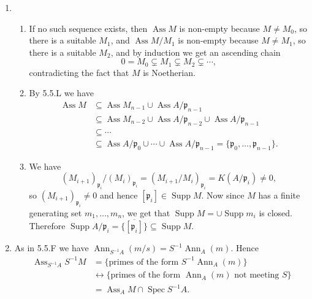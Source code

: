 \documentclass{report}
\newcommand{\closure}[1]{\overline{#1}} %
\newcommand{\p}{\mathfrak{p}}
\DeclareMathOperator{\Supp}{Supp}
\DeclareMathOperator{\Spec}{Spec}
\DeclareMathOperator{\Ann}{Ann}
\DeclareMathOperator{\Ass}{Ass}
\begin{document}
\begin{enumerate}[label=\textbf{5.5.\Alph*.}]
	\item
	      \begin{enumerate}[label=(\alph*)]
		      \item If no such sequence exists, then $\Ass M$ is non-empty
		            because $M\ne M_0$, so there is a suitable $M_1$, and
		            $\Ass M/M_1$ is non-empty because $M\ne M_1$, so there is a
		            suitable $M_2$, and by induction we get an ascending chain
		            \begin{equation*}
			            0 = M_0 \subsetneq M_1 \subsetneq M_2 \subsetneq \cdots,
		            \end{equation*}
		            contradicting the fact that $M$ is Noetherian.

		      \item By 5.5.L we have
		            \begin{align*}
			            \Ass M & \subseteq \Ass M_{n-1} \cup \Ass A/\p_{n-1}                      \\
			                   & \subseteq \Ass M_{n-2} \cup \Ass A/\p_{n-2} \cup \Ass A/\p_{n-1} \\
			                   & \subseteq \cdots                                                 \\
			                   & \subseteq \Ass A/\p_0 \cup \cdots \cup \Ass A/\p_{n-1}
			            = \{\p_0,\ldots,\p_{n-1}\}.
		            \end{align*}

		      \item We have
		            \begin{equation*}
			            (M_{i+1})_{\p_i} / (M_i)_{\p_i}
			            = (M_{i+1}/M_i)_{\p_i}
			            = K(A/\p_i)
			            \ne 0,
		            \end{equation*}
		            so $(M_{i+1})_{\p_i}\ne0$ and hence $[\p_i]\in\Supp M$. Now
		            since $M$ has a finite generating set $m_1,\ldots,m_n$, we get
		            that $\Supp M=\cup\Supp m_i$ is closed. Therefore
		            $\Supp A/\p_i=\closure{\{[\p_i]\}}\subseteq\Supp M$.
	      \end{enumerate}

	\item As in 5.5.F we have $\Ann_{S^{-1}A}(m/s)=S^{-1}\Ann_A(m)$. Hence
	      \begin{align*}
		      \Ass_{S^{-1}A}S^{-1}M
		       & = \{\text{primes of the form $S^{-1}\Ann_A(m)$}\}                         \\
		       & \leftrightarrow \{\text{primes of the form $\Ann_A(m)$ not meeting $S$}\} \\
		       & = \Ass_AM\cap\Spec S^{-1}A.
	      \end{align*}


\end{enumerate}
\end{document}
